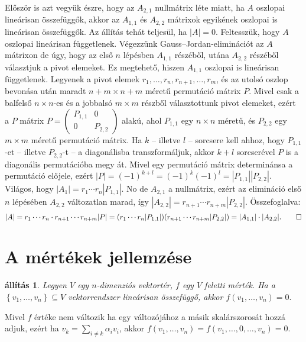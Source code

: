 \documentclass[9pt, a4paper, showtrims]{memoir}
\makeatletter
\renewenvironment{proof}[1][\proofname]
    {\par\pushQED{\qed}%
    \normalfont \topsep6\p@\@plus6\p@\relax
    \trivlist
    \item[\hskip\labelsep
        \itshape
    #1\@addpunct{:}]\ignorespaces}
    {\popQED\endtrivlist\@endpefalse}
\theoremstyle{plain}
\newtheorem{proposition}{állítás}[chapter]
\theoremstyle{remark}
\theoremstyle{definition}
\makeatother
\begin{document}
\begin{proof}[Gauss--Jordan-elimináció alapján]
    Először is azt vegyük észre, hogy az $A_{2,1}$ nullmátrix léte miatt,
    ha $A$ oszlopai lineárisan összefüggők, 
    akkor az $A_{1,1}$ és $A_{2,2}$ mátrixok egyikének oszlopai is lineárisan összefüggők.
    Az állítás tehát teljesül, ha $|A|=0$.
    Feltesszük, hogy $A$ oszlopai lineárisan függetlenek.
    Végezzünk Gauss--Jordan-eliminációt az $A$ mátrixon de úgy,
    hogy az első $n$ lépésben $A_{1,1}$ részéből, utána $A_{2,2}$ részéből választjuk a pivot elemeket.
    Ez megtehető, hiszen $A_{1,1}$ oszlopai is lineárisan függetlenek.
    Legyenek a pivot elemek $r_1,\dots,r_n,r_{n+1},\dots,r_m$, 
    és az utolsó oszlop bevonása után maradt $n+m\times n+m$ méretű permutáció mátrix $P$.
    Mivel csak a balfelső $n\times n$-es és a jobbalsó $m\times m$ részből választottunk pivot elemeket,
    ezért a $P$ mátrix
    \begin{math}
        P=
        \begin{pmatrix}
            P_{1,1}& 0\\
            0& P_{2,2}
        \end{pmatrix}
    \end{math}
    alakú, ahol $P_{1,1}$ egy $n\times n$ méretű,
    és $P_{2,2}$ egy $m\times m$ méretű permutáció mátrix.
    Ha $k$ -- illetve $l$ -- sorcsere kell ahhoz, 
    hogy $P_{1,1}$-et -- illetve $P_{2,2}$-t -- a diagonálisba transzformáljuk,
    akkor $k+l$ sorcserével $P$ is a diagonális permutációba megy át.
    Mivel egy permutáció mátrix determinánsa a permutáció előjele, ezért
    \(
        |P|=(-1)^{k+l}=\left( -1 \right)^k\left( -1 \right)^l=|P_{1,1}||P_{2,2}|.
    \)
    Világos, hogy $|A_1|=r_1\cdots r_n|P_{1,1}|$. 
    No de $A_{2,1}$ a nullmátrix, ezért az elimináció első $n$ lépésében $A_{2,2}$ változatlan marad,
    így $|A_{2,2}|=r_{n+1}\cdots r_{n+m}|P_{2,2}|$.
    Összefoglalva:
    \[
        |A|
        =r_1\cdots r_n\cdot r_{n+1}\cdots r_{n+m}|P|
        =(r_1\cdots r_n|P_{1,1}|)(r_{n+1}\cdots r_{n+m}|P_{2,2}|)
        =|A_{1,1}|\cdot|A_{2,2}|.\qedhere
    \]
\end{proof}

\section{A mértékek jellemzése}

\begin{proposition}
    Legyen $V$ egy $n$-dimenziós vektortér, $f$ egy $V$ feletti mérték.
    Ha a $\left\{ v_{1},\ldots ,v_{n}\right\} \subseteq V$ vektorrendszer lineárisan összefüggő, 
    akkor 
    \(
        f\left( v_{1},\ldots ,v_{n}\right) =0.
    \)
\end{proposition}
\begin{proof}
    Mivel $f$ értéke nem változik ha egy változójához a másik skalárszorosát hozzá adjuk, 
    ezért ha $v_{k}=\sum_{i\neq k}\alpha _{i}v_{i}$,
    akkor 
    $f\left(v_{1},\ldots ,v_{n}\right) 
    =
    f\left( v_{1},\ldots ,0,\ldots ,v_{n}\right) 
    =
    0$.
\end{proof}
\end{document}
